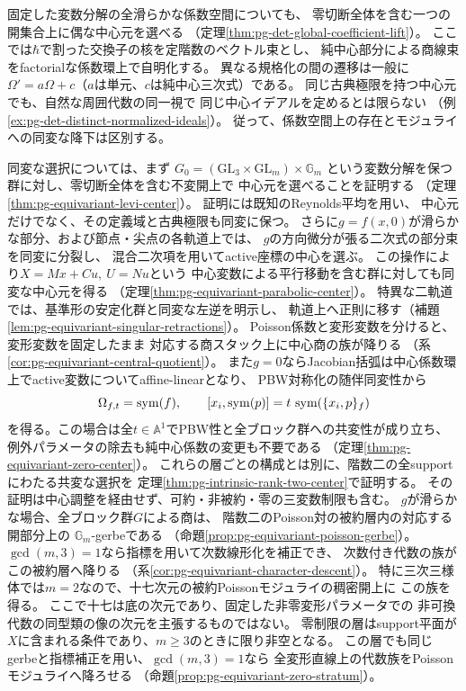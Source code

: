 固定した変数分解の全滑らかな係数空間についても、
零切断全体を含む一つの開集合上に偶な中心元を選べる
（定理\ref{thm:pg-det-global-coefficient-lift}）。
ここでは$\hbar$で割った交換子の核を定階数のベクトル束とし、
純中心部分による商線束をfactorialな係数環上で自明化する。
異なる規格化の間の遷移は一般に
$\Omega'=a\Omega+c$（$a$は単元、$c$は純中心三次式）である。
同じ古典極限を持つ中心元でも、自然な周囲代数の同一視で
同じ中心イデアルを定めるとは限らない
（例\ref{ex:pg-det-distinct-normalized-ideals}）。
従って、係数空間上の存在とモジュライへの同変な降下は区別する。

同変な選択については、まず
$G_0=(\mathrm{GL}_3\times\mathrm{GL}_m)\times\mathbb G_m$
という変数分解を保つ群に対し、零切断全体を含む不変開上で
中心元を選べることを証明する
（定理\ref{thm:pg-equivariant-levi-center}）。
証明には既知のReynolds平均を用い、
中心元だけでなく、その定義域と古典極限も同変に保つ。
さらに$g=f(x,0)$が滑らかな部分、および節点・尖点の各軌道上では、
$g$の方向微分が張る二次式の部分束を同変に分裂し、
混合二次項を用いてactive座標の中心を選ぶ。
この操作により$X=Mx+Cu,\ U=Nu$という
中心変数による平行移動を含む群に対しても同変な中心元を得る
（定理\ref{thm:pg-equivariant-parabolic-center}）。
特異な二軌道では、基準形の安定化群と同変な左逆を明示し、
軌道上へ正則に移す（補題\ref{lem:pg-equivariant-singular-retractions}）。
Poisson係数と変形変数を分けると、変形変数を固定したまま
対応する商スタック上に中心商の族が降りる
（系\ref{cor:pg-equivariant-central-quotient}）。
また$g=0$ならJacobian括弧は中心係数環上でactive変数についてaffine-linearとなり、
PBW対称化の随伴同変性から
\begin{equation}\label{eq:intro-zero-restriction-center}
 \Omega_{f,t}=\operatorname{sym}(f),\qquad
 [x_i,\operatorname{sym}(p)]=t\,\operatorname{sym}(\{x_i,p\}_f)
\end{equation}
を得る。この場合は全$t\in\mathbb A^1$でPBW性と全ブロック群への共変性が成り立ち、
例外パラメータの除去も純中心係数の変更も不要である
（定理\ref{thm:pg-equivariant-zero-center}）。
これらの層ごとの構成とは別に、階数二の全supportにわたる共変な選択を
定理\ref{thm:pg-intrinsic-rank-two-center}で証明する。
その証明は中心調整を経由せず、可約・非被約・零の三変数制限も含む。
$g$が滑らかな場合、全ブロック群$G$による商は、
階数二のPoisson対の被約層内の対応する開部分上の
$\mathbb G_m$-gerbeである
（命題\ref{prop:pg-equivariant-poisson-gerbe}）。
$\gcd(m,3)=1$なら指標を用いて次数線形化を補正でき、
次数付き代数の族がこの被約層へ降りる
（系\ref{cor:pg-equivariant-character-descent}）。
特に三次三様体では$m=2$なので、十七次元の被約Poissonモジュライの稠密開上に
この族を得る。
ここで十七は底の次元であり、固定した非零変形パラメータでの
非可換代数の同型類の像の次元を主張するものではない。
零制限の層はsupport平面が$X$に含まれる条件であり、$m\ge3$のときに限り非空となる。
この層でも同じgerbeと指標補正を用い、$\gcd(m,3)=1$なら
全変形直線上の代数族をPoissonモジュライへ降ろせる
（命題\ref{prop:pg-equivariant-zero-stratum}）。

